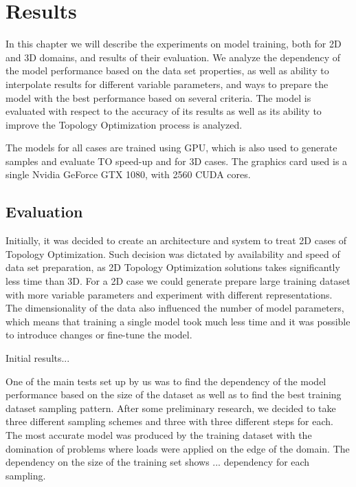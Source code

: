 
\chapter{Results}
\label{chapter:Results}

In this chapter we will describe the experiments on model training, both for 2D and 3D domains, and results of their evaluation.
We analyze the dependency of the model performance based on the data set properties, as well as ability to interpolate results for different variable parameters, and ways to prepare the model with the best performance based on several criteria. 
The model is evaluated with respect to the accuracy of its results as well as  its ability to improve the Topology Optimization process is analyzed.

The models for all cases are trained using GPU, which is also used to generate samples and evaluate TO speed-up and for 3D cases.
The graphics card used is a single Nvidia GeForce GTX 1080, with 2560 CUDA cores. 


\section{Evaluation}

Initially, it was decided to create an architecture and system to treat 2D cases of Topology Optimization.
Such decision was dictated by availability and speed of data set preparation, as 2D Topology Optimization solutions takes significantly less time than 3D. 
For a 2D case we could generate prepare large training dataset with more variable parameters and experiment with different representations.
The dimensionality of the data also influenced the number of model parameters, which means that training a single model took much less time and it was possible to introduce changes or fine-tune the model.



Initial results...
\medskip

One of the main tests set up by us was to find the dependency of the model performance based on the size of the dataset as well as to find the best training dataset sampling pattern.
After some preliminary research, we decided to take three different sampling schemes and three with three different steps for each. 
The most accurate model was produced by the training dataset with the domination of problems where loads were applied on the edge of the domain.
The dependency on the size of the training set shows ...  dependency for each sampling.
\medskip

